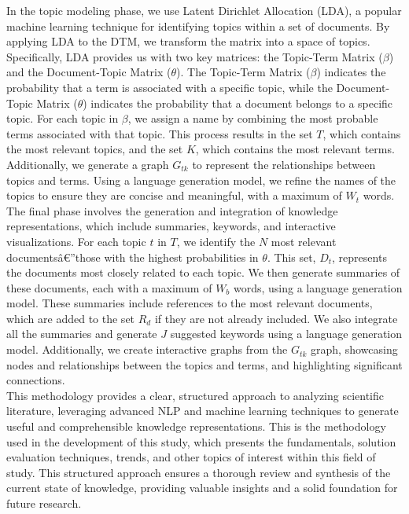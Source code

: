\documentclass[runningheads]{llncs}
\begin{document}
In the topic modeling phase, we use Latent Dirichlet Allocation (LDA), a popular machine learning technique for identifying topics within a set of documents. By applying LDA to the DTM, we transform the matrix into a space of topics. Specifically, LDA provides us with two key matrices: the Topic-Term Matrix ($\beta$) and the Document-Topic Matrix ($\theta$). The Topic-Term Matrix ($\beta$) indicates the probability that a term is associated with a specific topic, while the Document-Topic Matrix ($\theta$) indicates the probability that a document belongs to a specific topic. For each topic in $\beta$, we assign a name by combining the most probable terms associated with that topic. This process results in the set $T$, which contains the most relevant topics, and the set $K$, which contains the most relevant terms. Additionally, we generate a graph $G_{tk}$ to represent the relationships between topics and terms. Using a language generation model, we refine the names of the topics to ensure they are concise and meaningful, with a maximum of $W_{t}$ words.\\

The final phase involves the generation and integration of knowledge representations, which include summaries, keywords, and interactive visualizations. For each topic $t$ in $T$, we identify the $N$ most relevant documentsâ€”those with the highest probabilities in $\theta$. This set, $D_t$, represents the documents most closely related to each topic. We then generate summaries of these documents, each with a maximum of $W_b$ words, using a language generation model. These summaries include references to the most relevant documents, which are added to the set $R_d$ if they are not already included. We also integrate all the summaries and generate $J$ suggested keywords using a language generation model. Additionally, we create interactive graphs from the $G_{tk}$ graph, showcasing nodes and relationships between the topics and terms, and highlighting significant connections.\\

This methodology provides a clear, structured approach to analyzing scientific literature, leveraging advanced NLP and machine learning techniques to generate useful and comprehensible knowledge representations. This is the methodology used in the development of this study, which presents the fundamentals, solution evaluation techniques, trends, and other topics of interest within this field of study. This structured approach ensures a thorough review and synthesis of the current state of knowledge, providing valuable insights and a solid foundation for future research.
\end{document}
